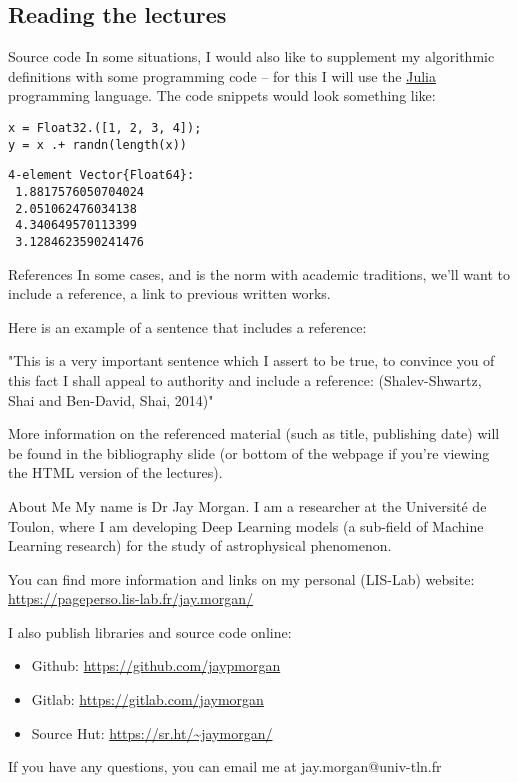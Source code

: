 \documentclass[10pt]{beamer}
\begin{document}
\subsection*{Reading the lectures}
\label{sec:orgb09c647}

\begin{frame}[label={sec:orgb55805e},fragile]{Source code}
 In some situations, I would also like to supplement my algorithmic definitions with
some programming code -- for this I will use the \href{https://julialang.org/}{Julia} programming language. The code
snippets would look something like:

\begin{verbatim}
x = Float32.([1, 2, 3, 4]);
y = x .+ randn(length(x))
\end{verbatim}

\begin{verbatim}
4-element Vector{Float64}:
 1.8817576050704024
 2.051062476034138
 4.340649570113399
 3.1284623590241476
\end{verbatim}
\end{frame}

\begin{frame}[label={sec:org74f7ba7}]{References}
In some cases, and is the norm with academic traditions, we'll want to include a
reference, a link to previous written works.

Here is an example of a sentence that includes a reference:

"This is a very important sentence which I assert to be true, to convince you of this
fact I shall appeal to authority and include a reference:
(Shalev-Shwartz, Shai and Ben-David, Shai, 2014)"

More information on the referenced material (such as title, publishing date) will be
found in the bibliography slide (or bottom of the webpage if you're viewing the HTML
version of the lectures).
\end{frame}

\begin{frame}[label={sec:org0021423}]{About Me}
My name is Dr Jay Morgan. I am a researcher at the Université de Toulon, where I am
developing Deep Learning models (a sub-field of Machine Learning research) for the
study of astrophysical phenomenon.

You can find more information and links on my personal (LIS-Lab) website:
\url{https://pageperso.lis-lab.fr/jay.morgan/}

I also publish libraries and source code online:
\begin{itemize}
\item Github: \url{https://github.com/jaypmorgan}
\item Gitlab: \url{https://gitlab.com/jaymorgan}
\item Source Hut: \url{https://sr.ht/\~jaymorgan/}
\end{itemize}

If you have any questions, you can email me at jay.morgan@univ-tln.fr
\end{frame}
\end{document}
